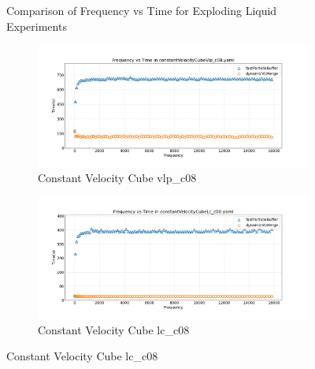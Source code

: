 \begin{figure}[htbp]
    \vspace{1em}
    \caption{Comparison of Frequency vs Time for Exploding Liquid Experiments}
    \label{fig:mainExplodingLiquid}
\end{figure}


\begin{figure}[htbp]
    \centering
    \vspace{-0.5em}
    \begin{subfigure}[b]{\textwidth}
        \centering
        \includegraphics[width=0.9\linewidth]{graphs/constantVelocityCube/normalExperiments/freq/vlpc08.png}
        \vspace{-0.5em}
        \caption{\scriptsize Constant Velocity Cube vlp\_c08}
        \label{fig:vlpc08constantVelocityCube}
    \end{subfigure}

    \begin{subfigure}[b]{\textwidth}
        \centering
        \includegraphics[width=0.9\linewidth]{graphs/constantVelocityCube/normalExperiments/freq/lcc08.png}
        \vspace{-0.5em}
        \caption{\scriptsize Constant Velocity Cube lc\_c08}
        \label{fig:lcc08constantVelocityCube}
    \end{subfigure}


\end{figure}
